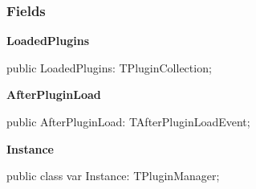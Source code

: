 \documentclass{report}
\newif\ifpdf
\begin{document}
\subsubsection*{\large{\textbf{Fields}}\normalsize\hspace{1ex}\hfill}
\begin{list}{}{
\setlength{\itemindent}{0cm}
\setlength{\listparindent}{0cm}
\setlength{\leftmargin}{\evensidemargin}
\addtolength{\leftmargin}{\tmplength}
\settowidth{\labelsep}{X}
\addtolength{\leftmargin}{\labelsep}
\setlength{\labelwidth}{\tmplength}
}
\label{ok_class_var.TPluginManager-LoadedPlugins}
\item[\textbf{LoadedPlugins}\hfill]
\ifpdf
\begin{flushleft}
\fi
\begin{ttfamily}
public LoadedPlugins: TPluginCollection;\end{ttfamily}

\ifpdf
\end{flushleft}
\fi


\par  \label{ok_class_var.TPluginManager-AfterPluginLoad}
\item[\textbf{AfterPluginLoad}\hfill]
\ifpdf
\begin{flushleft}
\fi
\begin{ttfamily}
public AfterPluginLoad: TAfterPluginLoadEvent;\end{ttfamily}

\ifpdf
\end{flushleft}
\fi


\par  \label{ok_class_var.TPluginManager-Instance}
\item[\textbf{Instance}\hfill]
\ifpdf
\begin{flushleft}
\fi
\begin{ttfamily}
public class var Instance: TPluginManager;\end{ttfamily}

\ifpdf
\end{flushleft}
\fi


\par  \end{list}
\end{document}
